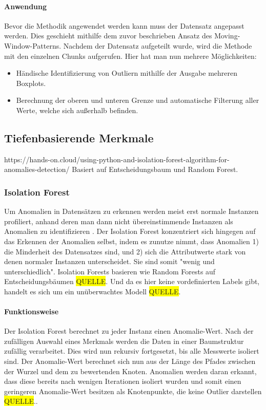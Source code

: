 \paragraph{Anwendung}
Bevor die Methodik angewendet werden kann muss der Datensatz angepasst werden. Dies geschieht mithilfe dem zuvor beschrieben Ansatz des Moving-Window-Patterns. Nachdem der Datensatz aufgeteilt wurde, wird die Methode mit den einzelnen Chunks aufgerufen. Hier hat man nun mehrere Möglichkeiten: 
\begin{itemize}
	\item Händische Identifizierung von Outliern mithilfe der Ausgabe mehreren Boxplots.
	\item Berechnung der oberen und unteren Grenze und automatische Filterung aller Werte, welche sich außerhalb befinden.
\end{itemize}

\newpage

\subsection{Tiefenbasierende Merkmale}
https://hands-on.cloud/using-python-and-isolation-forest-algorithm-for-anomalies-detection/
Basiert auf Entscheidungsbaum und Random Forest.
\subsubsection{Isolation Forest}
Um Anomalien in Datensätzen zu erkennen werden meist erst normale Instanzen profiliert, anhand deren man dann nicht übereinstimmende Instanzen als Anomalien zu identifizieren \cite{liuIsolationForest2008}. Der Isolation Forest konzentriert sich hingegen auf das Erkennen der Anomalien selbst, indem es zunutze nimmt, dass Anomalien 1) die Minderheit des Datensatzes sind, und 2) sich die Attributwerte stark von denen normaler Instanzen unterscheidet. Sie sind somit "wenig und unterschiedlich"\cite{liuIsolationForest2008}. Isolation Forests basieren wie Random Forests auf Entscheidungsbäumen \colorbox{yellow}{QUELLE}. Und da es hier keine vordefinierten Labels gibt, handelt es sich um ein unüberwachtes Modell \colorbox{yellow}{QUELLE}.
\paragraph{Funktionsweise}
Der Isolation Forest berechnet zu jeder Instanz einen Anomalie-Wert. Nach der zufälligen Auswahl eines Merkmals werden die Daten in einer Baumstruktur zufällig verarbeitet. Dies wird nun rekursiv fortgesetzt, bis alle Messwerte isoliert sind. Der Anomalie-Wert berechnet sich nun aus der Länge des Pfades zwischen der Wurzel und dem zu bewertenden Knoten. Anomalien werden daran erkannt, dass diese bereits nach wenigen Iterationen isoliert wurden und somit einen geringeren Anomalie-Wert besitzen als Knotenpunkte, die keine Outlier darstellen \colorbox{yellow}{QUELLE}..
